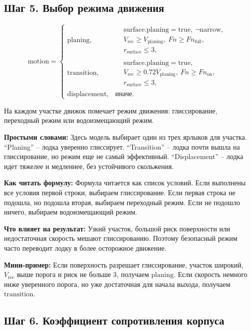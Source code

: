 \documentclass[12pt,a4paper]{article}
\newcommand{\simple}[1]{\par\smallskip\noindent\textbf{Простыми словами:} #1\par}
\newcommand{\howto}[1]{\par\smallskip\noindent\textbf{Как читать формулу:} #1\par}
\newcommand{\effect}[1]{\par\smallskip\noindent\textbf{Что влияет на результат:} #1\par}
\newcommand{\exampletext}[1]{\par\smallskip\noindent\textbf{Мини-пример:} #1\par}
\begin{document}
\subsection{Шаг 5. Выбор режима движения}

\begin{equation}
\mathrm{motion} =
\begin{cases}
\mathrm{planing}, &
\begin{aligned}
&\mathrm{surface.planing}=\mathrm{true},\ \neg\mathrm{narrow}, \\
&V_{\mathrm{rec}} \ge V_{\mathrm{planing}},\ Fn \ge Fn_{\mathrm{full}}, \\
&r_{\mathrm{surface}} \le 3,
\end{aligned}
\\[1.2em]
\mathrm{transition}, &
\begin{aligned}
&\mathrm{surface.planing}=\mathrm{true}, \\
&V_{\mathrm{rec}} \ge 0.72V_{\mathrm{planing}},\ Fn \ge Fn_{\mathrm{on}}, \\
&r_{\mathrm{surface}} \le 3,
\end{aligned}
\\[1.2em]
\mathrm{displacement}, & \text{иначе}.
\end{cases}
\end{equation}

На каждом участке движок помечает режим движения: глиссирование, переходный
режим или водоизмещающий режим.

\simple{Здесь модель выбирает один из трех ярлыков для участка. ``Planing'' --
лодка уверенно глиссирует. ``Transition'' -- лодка почти вышла на глиссирование,
но режим еще не самый эффективный. ``Displacement'' -- лодка идет тяжелее и
медленнее, без устойчивого скольжения.}
\howto{Формула читается как список условий. Если выполнены все условия первой
строки, выбираем глиссирование. Если первая строка не подошла, но подошла
вторая, выбираем переходный режим. Если не подошло ничего, выбираем
водоизмещающий режим.}
\effect{Узкий участок, большой риск поверхности или недостаточная скорость
мешают глиссированию. Поэтому безопасный режим часто переводит лодку в более
осторожное движение.}
\exampletext{Если поверхность разрешает глиссирование, участок широкий,
\(V_{\mathrm{rec}}\) выше порога и риск не больше 3, получаем
\(\mathrm{planing}\). Если скорость немного ниже уверенного порога, но уже
достаточная для начала выхода, получаем \(\mathrm{transition}\).}

\subsection{Шаг 6. Коэффициент сопротивления корпуса}
\end{document}
